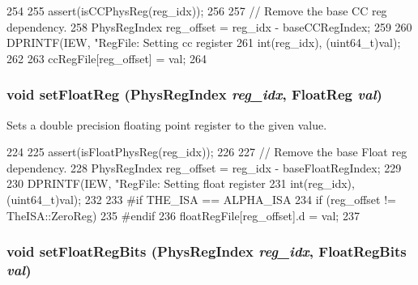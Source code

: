 \begin{DoxyCode}
254     {
255         assert(isCCPhysReg(reg_idx));
256 
257         // Remove the base CC reg dependency.
258         PhysRegIndex reg_offset = reg_idx - baseCCRegIndex;
259 
260         DPRINTF(IEW, "RegFile: Setting cc register %
261                 int(reg_idx), (uint64_t)val);
262 
263         ccRegFile[reg_offset] = val;
264     }
\end{DoxyCode}
\hypertarget{classPhysRegFile_a8aeacafd7db9859a055d4ac5657e6bb7}{
\subsubsection[{setFloatReg}]{\setlength{\rightskip}{0pt plus 5cm}void setFloatReg ({\bf PhysRegIndex} {\em reg\_\-idx}, \/  {\bf FloatReg} {\em val})}}
\label{classPhysRegFile_a8aeacafd7db9859a055d4ac5657e6bb7}
Sets a double precision floating point register to the given value. 


\begin{DoxyCode}
224     {
225         assert(isFloatPhysReg(reg_idx));
226 
227         // Remove the base Float reg dependency.
228         PhysRegIndex reg_offset = reg_idx - baseFloatRegIndex;
229 
230         DPRINTF(IEW, "RegFile: Setting float register %
231                 int(reg_idx), (uint64_t)val);
232 
233 #if THE_ISA == ALPHA_ISA
234         if (reg_offset != TheISA::ZeroReg)
235 #endif
236             floatRegFile[reg_offset].d = val;
237     }
\end{DoxyCode}
\hypertarget{classPhysRegFile_a394e971ff5d17b49dee93063772f87ce}{
\subsubsection[{setFloatRegBits}]{\setlength{\rightskip}{0pt plus 5cm}void setFloatRegBits ({\bf PhysRegIndex} {\em reg\_\-idx}, \/  {\bf FloatRegBits} {\em val})}}
\label{classPhysRegFile_a394e971ff5d17b49dee93063772f87ce}



